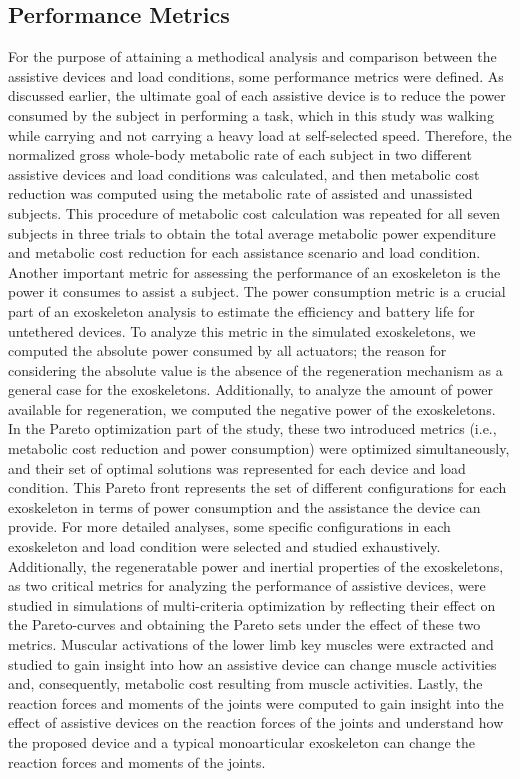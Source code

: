\documentclass[10pt,letterpaper]{article}
\begin{document}
\subsection*{Performance Metrics}
For the purpose of attaining a methodical analysis and comparison between the assistive devices and load conditions, some performance metrics were defined. As discussed earlier, the ultimate goal of each assistive device is to reduce the power consumed by the subject in performing a task, which in this study was walking while carrying and not carrying a heavy load at self-selected speed.
Therefore, the normalized gross whole-body metabolic rate of each subject in two different assistive devices and load conditions was calculated, and then metabolic cost reduction was computed using the metabolic rate of assisted and unassisted subjects. This procedure of metabolic cost calculation was repeated for all seven subjects in three trials to obtain the total average metabolic power expenditure and metabolic cost reduction for each assistance scenario and load condition.\\
Another important metric for assessing the performance of an exoskeleton is the power it consumes to assist a subject. The power consumption metric is a crucial part of an exoskeleton analysis to estimate the efficiency and battery life for untethered devices. To analyze this metric in the simulated exoskeletons, we computed the absolute power consumed by all actuators; the reason for considering the absolute value is the absence of the regeneration mechanism as a general case for the exoskeletons. Additionally, to analyze the amount of power available for regeneration, we computed the negative power of the exoskeletons.
In the Pareto optimization part of the study, these two introduced metrics (i.e., metabolic cost reduction and power consumption) were optimized simultaneously, and their set of optimal solutions was represented for each device and load condition. This Pareto front represents the set of different configurations for each exoskeleton in terms of power consumption and the assistance the device can provide. For more detailed analyses, some specific configurations in each exoskeleton and load condition were selected and studied exhaustively.\\
Additionally, the regeneratable power and inertial properties of the exoskeletons, as two critical metrics for analyzing the performance of assistive devices, were studied in simulations of multi-criteria optimization by reflecting their effect on the Pareto-curves and obtaining the Pareto sets under the effect of these two metrics.
Muscular activations of the lower limb key muscles were extracted and studied to gain insight into how an assistive device can change muscle activities and, consequently, metabolic cost resulting from muscle activities. 
Lastly, the reaction forces and moments of the joints  were computed to gain insight into the effect of assistive devices on the reaction forces of the joints and understand how the proposed device and a typical monoarticular exoskeleton can change the reaction forces and moments of the joints. 
\end{document}
